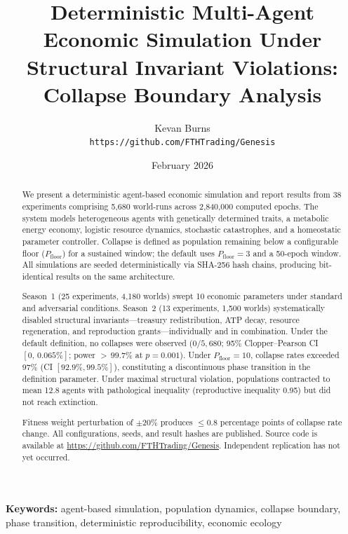 \documentclass[11pt,a4paper]{article}
\title{Deterministic Multi-Agent Economic Simulation Under\\Structural Invariant Violations: Collapse Boundary Analysis}
\author{Kevan Burns\\
  \texttt{https://github.com/FTHTrading/Genesis}}
\date{February 2026}
\begin{document}
\maketitle

\begin{abstract}
We present a deterministic agent-based economic simulation and report results from 38 experiments comprising 5,680 world-runs across 2,840,000 computed epochs. The system models heterogeneous agents with genetically determined traits, a metabolic energy economy, logistic resource dynamics, stochastic catastrophes, and a homeostatic parameter controller. Collapse is defined as population remaining below a configurable floor ($P_{\text{floor}}$) for a sustained window; the default uses $P_{\text{floor}} = 3$ and a 50-epoch window. All simulations are seeded deterministically via SHA-256 hash chains, producing bit-identical results on the same architecture.

Season~1 (25 experiments, 4,180 worlds) swept 10 economic parameters under standard and adversarial conditions. Season~2 (13 experiments, 1,500 worlds) systematically disabled structural invariants---treasury redistribution, ATP decay, resource regeneration, and reproduction grants---individually and in combination. Under the default definition, no collapses were observed ($0/5{,}680$; 95\% Clopper--Pearson CI $[0,\, 0.065\%]$; power ${>}\,99.7\%$ at $p = 0.001$). Under $P_{\text{floor}} = 10$, collapse rates exceeded 97\% (CI $[92.9\%, 99.5\%]$), constituting a discontinuous phase transition in the definition parameter. Under maximal structural violation, populations contracted to mean 12.8 agents with pathological inequality (reproductive inequality 0.95) but did not reach extinction.

Fitness weight perturbation of $\pm 20\%$ produces $\leq 0.8$ percentage points of collapse rate change. All configurations, seeds, and result hashes are published. Source code is available at \url{https://github.com/FTHTrading/Genesis}. Independent replication has not yet occurred.
\end{abstract}

\medskip
\noindent\textbf{Keywords:} agent-based simulation, population dynamics, collapse boundary, phase transition, deterministic reproducibility, economic ecology

\end{document}

